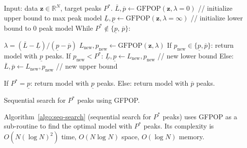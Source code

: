 \documentclass[article]{jss}
\newcommand{\RR}{\mathbb R}
\begin{document}
\begin{algorithm}
    \begin{algorithmic}[1]
  \STATE Input: data $\mathbf z\in\RR^N$, target peaks $P^*$.
  \STATE $\overline L,\overline p \gets \text{GFPOP}(\mathbf z, \lambda=0)$ // initialize upper bound to max peak model
  \STATE $\underline L,\underline p \gets \text{GFPOP}(\mathbf z, \lambda=\infty)$ // initialize lower bound to 0 peak model
  \STATE While $P^*\not\in \{\underline p,\, \overline p\}$:
  \begin{ALC@g}
    \STATE $\lambda=(\overline L-\underline L)/(\underline p-\overline p)$
    \STATE $L_{\text{new}},p_{\text{new}}\gets\text{GFPOP}(\mathbf z, \lambda)$
    \STATE If $p_{\text{new}}\in\{\underline p, \overline p\}$: return model with $\underline p$ peaks.
    \STATE If $p_{\text{new}} < P^*$: $\underline L,\underline p\gets L_{\text{new}},p_{\text{new}}$ // new lower bound
    \STATE Else: $\overline L,\overline p\gets L_{\text{new}},p_{\text{new}}$ // new upper bound
  \end{ALC@g}
  \STATE If $P^*=\underline p$: return model with $\underline p$ peaks.
  \STATE Else: return model with $\overline p$ peaks.
  \end{algorithmic}
\caption{\label{algo:seq-search}Sequential search for $P^*$ peaks using GFPOP.}
\end{algorithm}

Algorithm~\ref{algo:seq-search} (sequential search for $P^*$ peaks)
uses GFPOP as a sub-routine to find the optimal model with $P^*$
peaks. Its complexity is $O(N(\log N)^2)$ time, $O(N\log N)$ space,
$O(\log N)$ memory.

\end{document}
